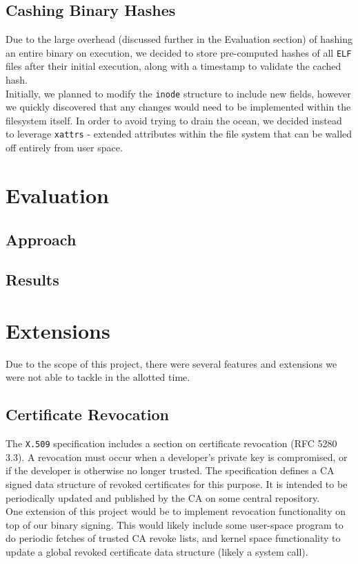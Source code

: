 \documentclass[12pt, letterpaper]{report}
\begin{document}
	\subsection{Cashing Binary Hashes}
		Due to the large overhead (discussed further in the Evaluation section) of hashing an entire binary on execution, we decided to store pre-computed hashes of all \texttt{ELF} files after their initial execution, along with a timestamp to validate the cached hash. \\
		
		Initially, we planned to modify the \texttt{inode} structure to include new fields, however we quickly discovered that any changes would need to be implemented within the filesystem itself. In order to avoid trying to drain the ocean, we decided instead to leverage \texttt{xattrs} - extended attributes within the file system that can be walled off entirely from user space.
	
\section{Evaluation}
	\subsection{Approach}
	\subsection{Results}

\section{Extensions}
	Due to the scope of this project, there were several features and extensions we were not able to tackle in the allotted time. 

	\subsection{Certificate Revocation}
		The \texttt{X.509} specification includes a section on certificate revocation (RFC 5280 3.3). A revocation must occur when a developer's private key is compromised, or if the developer is otherwise no longer trusted. The specification defines a CA signed data structure of revoked certificates for this purpose. It is intended to be periodically updated and published by the CA on some central repository. \\
		
One extension of this project would be to implement revocation functionality on top of our binary signing. This would likely include some user-space program to do periodic fetches of trusted CA revoke lists, and kernel space functionality to update a global revoked certificate data structure (likely a system call). 
\end{document}
